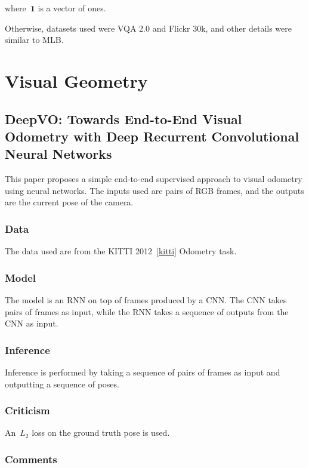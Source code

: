 \documentclass[a4paper, 12pt]{article}
\begin{document}
where~$\mathbf{1}$ is a vector of ones.

Otherwise, datasets used were VQA 2.0 and Flickr 30k, and other details were
similar to MLB\@.


\section{Visual Geometry}

\subsection{DeepVO\@: Towards End-to-End Visual Odometry with Deep Recurrent
            Convolutional Neural Networks~\citet{wang-deep-vo-2017}}

This paper proposes a simple end-to-end supervised approach to visual odometry
using neural networks. The inputs used are pairs of RGB frames, and the outputs
are the current pose of the camera.


\subsubsection{Data}

The data used are from the KITTI 2012~\ref{kitti} Odometry task.


\subsubsection{Model}

The model is an RNN on top of frames produced by a CNN\@. The CNN takes pairs
of frames as input, while the RNN takes a sequence of outputs from the CNN as
input.


\subsubsection{Inference}

Inference is performed by taking a sequence of pairs of frames as input and
outputting a sequence of poses.


\subsubsection{Criticism}

An~$L_2$ loss on the ground truth pose is used.


\subsubsection{Comments}
\end{document}
